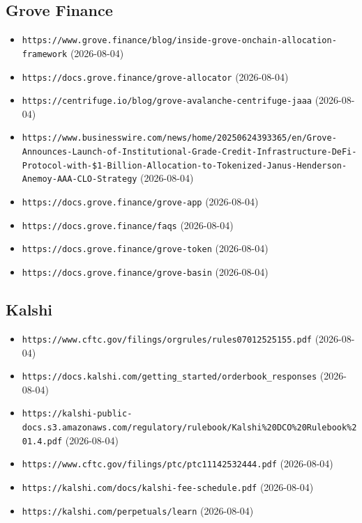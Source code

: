 \subsection*{Grove Finance}
\begin{itemize}\setlength{\itemsep}{0pt}\small
\item \texttt{https://www.grove.finance/blog/inside-grove-onchain-allocation-framework} (2026-08-04)
\item \texttt{https://docs.grove.finance/grove-allocator} (2026-08-04)
\item \texttt{https://centrifuge.io/blog/grove-avalanche-centrifuge-jaaa} (2026-08-04)
\item \texttt{https://www.businesswire.com/news/home/20250624393365/en/Grove-Announces-Launch-of-Institutional-Grade-Credit-Infrastructure-DeFi-Protocol-with-\$1-Billion-Allocation-to-Tokenized-Janus-Henderson-Anemoy-AAA-CLO-Strategy} (2026-08-04)
\item \texttt{https://docs.grove.finance/grove-app} (2026-08-04)
\item \texttt{https://docs.grove.finance/faqs} (2026-08-04)
\item \texttt{https://docs.grove.finance/grove-token} (2026-08-04)
\item \texttt{https://docs.grove.finance/grove-basin} (2026-08-04)
\end{itemize}

\subsection*{Kalshi}
\begin{itemize}\setlength{\itemsep}{0pt}\small
\item \texttt{https://www.cftc.gov/filings/orgrules/rules07012525155.pdf} (2026-08-04)
\item \texttt{https://docs.kalshi.com/getting\_started/orderbook\_responses} (2026-08-04)
\item \texttt{https://kalshi-public-docs.s3.amazonaws.com/regulatory/rulebook/Kalshi\%20DCO\%20Rulebook\%201.4.pdf} (2026-08-04)
\item \texttt{https://www.cftc.gov/filings/ptc/ptc11142532444.pdf} (2026-08-04)
\item \texttt{https://kalshi.com/docs/kalshi-fee-schedule.pdf} (2026-08-04)
\item \texttt{https://kalshi.com/perpetuals/learn} (2026-08-04)
\end{itemize}

